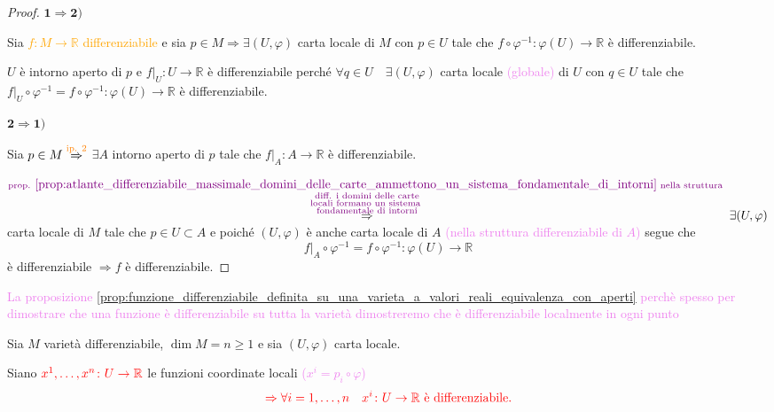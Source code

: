         \begin{proof}
        \mbox{}

        $\mathbf{1 \Rightarrow 2)}$ 
        
        Sia \textcolor{orange}{$f \colon M \to \mathbb{R}$ differenziabile} e sia $p \in M \Rightarrow \exists (U, \varphi)$ carta locale di $M$ con $p \in U$ tale che $f \circ \varphi^{-1} \colon \varphi(U) \to \mathbb{R}$ è differenziabile.
        
        $U$ è intorno aperto di $p$ e $f|_U \colon U \to \mathbb{R}$ è differenziabile perché 
        $\forall q \in U \quad \exists (U, \varphi)$ carta locale \textcolor{violet}{(globale)} di $U$ con $q \in U$ tale che 
        $f|_U \circ \varphi^{-1} = f \circ \varphi^{-1} \colon \varphi(U) \to \mathbb{R}$ è differenziabile.

        $\mathbf{2 \Rightarrow 1)}$
        
        Sia $p \in M \overset{\textcolor{orange}{\text{ip. } 2}}{\Rightarrow}$ $\exists A$ intorno aperto di $p$ tale che $f|_A \colon A \to \mathbb{R}$ è differenziabile. 
        
        $\overset{\textcolor{violet}{\substack{\text{prop. } \ref{prop:atlante_differenziabile_massimale_domini_delle_carte_ammettono_un_sistema_fondamentale_di_intorni} \text{ nella struttura } \\ \text{diff. i domini delle carte} \\\text{locali formano un sistema } \\ \text{fondamentale di intorni}}}}{\Rightarrow}
         \exists (U, \varphi)$ carta locale di $M$ tale che $p \in U \subset A$ e poiché $(U, \varphi)$ è anche carta locale di $A$ \textcolor{violet}{(nella struttura differenziabile di $A$)} segue che
        \[
        f|_A \circ \varphi^{-1} = f \circ \varphi^{-1} \colon \varphi(U) \to \mathbb{R}
        \]
        è differenziabile $\Rightarrow f$ è differenziabile.
        \end{proof}
        \textcolor{violet}{La proposizione \ref{prop:funzione_differenziabile_definita_su_una_varieta_a_valori_reali_equivalenza_con_aperti} perchè spesso per dimostrare
        che una funzione è differenziabile su tutta la varietà dimostreremo che è differenziabile localmente in ogni punto}
        \newpage
        \begin{esempio}
        \label{es:funzioni_coordinate_locali_differenziabili}
        \mbox{}

        Sia $M$ varietà differenziabile, $\dim M = n \ge 1$ e sia $(U, \varphi)$ carta locale. 
        
        Siano $\textcolor{red}{x^1, \dots, x^n \colon U \to \mathbb{R}}$ le funzioni coordinate locali \textcolor{violet}{($x^i=p_i \circ \varphi$)}
        \[
        \color{red} \Rightarrow \forall i=1, \dots, n \quad x^i \colon U \to \mathbb{R} \text{ è differenziabile.}
        \]
        \end{esempio}

